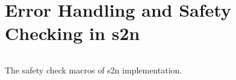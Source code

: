 \chapter{Error Handling and Safety Checking in s2n} \label{app:s2nSafety}

\begin{listing}[ht]
\inputminted[frame=single, breaklines, linenos, numbersep=5pt, tabsize=4, fontsize=\footnotesize, firstline=24, lastline=40]{c}{./contents/code/headers/s2n_safety.h} 
\caption{The safety check macros of s2n implementation.}
\end{listing}